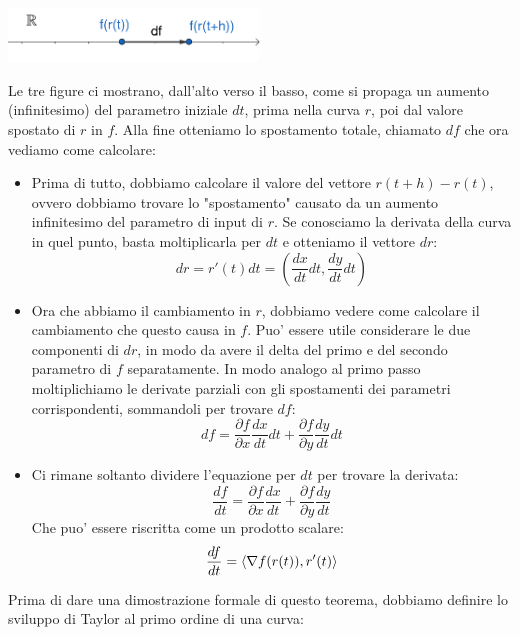 \documentclass{report}
\begin{document}
\begin{center}
  \includegraphics[width=0.5\textwidth]{img/2024-05-05-18-08-01.png}
\end{center}
Le tre figure ci mostrano, dall'alto verso il basso, come si propaga un aumento (infinitesimo) del parametro iniziale $ dt $, prima nella curva $ r $, poi dal valore spostato di $ r $ in $ f $. Alla fine otteniamo lo spostamento totale, chiamato $ df $ che ora vediamo come calcolare:
\begin{itemize}
  \item Prima di tutto, dobbiamo calcolare il valore del vettore $ r(t+h)-r(t) $, ovvero dobbiamo trovare lo "spostamento" causato da un aumento infinitesimo del parametro di input di $ r $. Se conosciamo la derivata della curva in quel punto, basta moltiplicarla per $ dt $ e otteniamo il vettore $ dr $:
    \[
      dr = r'(t)dt = (\frac{dx}{dt}dt, \frac{dy}{dt}dt)
    \]
  \item Ora che abbiamo il cambiamento in $ r $, dobbiamo vedere come calcolare il cambiamento che questo causa in $ f $. Puo' essere utile considerare le due componenti di $ dr $, in modo da avere il delta del primo e del secondo parametro di $ f $ separatamente. In modo analogo al primo passo moltiplichiamo le derivate parziali con gli spostamenti dei parametri corrispondenti, sommandoli per trovare $ df $:
    \[
    df = \frac{\partial f}{\partial x}\frac{dx}{dt}dt + \frac{\partial f}{\partial y}\frac{dy}{dt}dt
    \]
  \item Ci rimane soltanto dividere l'equazione per $ dt $ per trovare la derivata:
    \[
    \frac{df}{dt} = \frac{\partial f}{\partial x}\frac{dx}{dt}+\frac{\partial f}{\partial y}\frac{dy}{dt}
    \]
    Che puo' essere riscritta come un prodotto scalare:
    \[
      \frac{df}{dt} = \langle \nabla f(r(t)), r'(t) \rangle
    \]
\end{itemize}
Prima di dare una dimostrazione formale di questo teorema, dobbiamo definire lo sviluppo di Taylor al primo ordine di una curva:
\dfn{}{
  Data $ r:]a,b[\to\mathbb{R}^n $ derivabile, sia $ k \in \{1,...,n\} $. Lo sviluppo di Taylor per $ r_k:]a,b[\to\mathbb{R} $ in $ t \in ]a,b[ $ e':
  \[
    r_k(t+s) = r_k(t) + r_k'(t)s + o_k(s)
  \]
  Quindi $ r(t+s) = r(t) + r'(t)s + o(s) $ (dove $ o(s) = (o_1(s),...,o_n(s)) $). 
}
\end{document}
